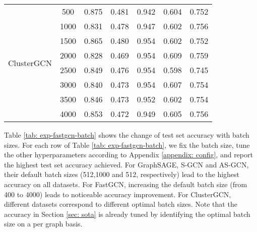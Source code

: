 \documentclass{article} \usepackage{iclr2020_conference,times}
\begin{document}
\begin{table*}[!ht]
\begin{tabular}{rcccccc}
        \multirow{8}{*}{ClusterGCN} & 500 & 0.875 & 0.481 & 0.942 & 0.604 & 0.752\\
         & 1000 & 0.831 & 0.478 & 0.947 & 0.602 & 0.756 \\
         & 1500 & 0.865 & 0.480 & 0.954 & 0.602 & 0.752\\
         & 2000 & 0.828 & 0.469 & 0.954 & 0.609 & 0.759\\
         & 2500 & 0.849 & 0.476 & 0.954 & 0.598 & 0.745\\
         & 3000 & 0.840 & 0.473 & 0.954 & 0.607 & 0.754\\
         & 3500 & 0.846 & 0.473 & 0.952 & 0.602 & 0.754\\
         & 4000 & 0.853 & 0.472 & 0.949 & 0.605 & 0.756\\
        \bottomrule
    \end{tabular}\label{tab: exp-fastgcn-batch}
\end{table*}






Table \ref{tab: exp-fastgcn-batch} shows the change of test set accuracy with batch sizes.
For each row of Table \ref{tab: exp-fastgcn-batch}, we fix the batch size, tune the other hyperparameters according to Appendix \ref{appendix: config}, and report the highest test set accuracy achieved. 
For GraphSAGE, S-GCN and AS-GCN, their default batch sizes (512,1000 and 512, respectively) lead to the highest accuracy on all datasets. For FastGCN, increasing the default batch size (from 400 to 4000) leads to noticeable accuracy improvement. For ClusterGCN, different datasets correspond to different optimal batch sizes. Note that the accuracy in Section \ref{sec: sota} is already tuned by identifying the optimal batch size on a per graph basis.
\end{document}
